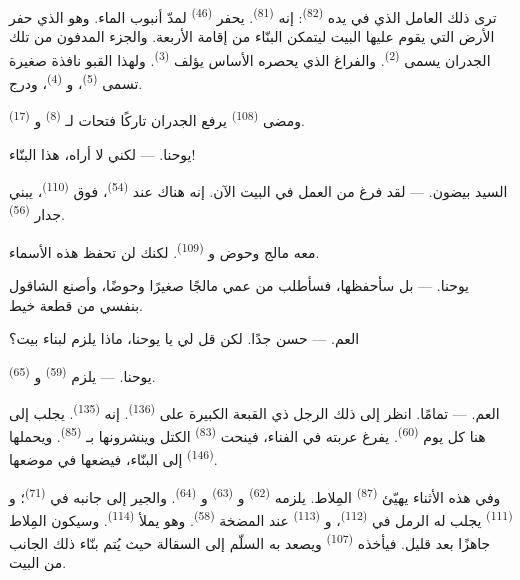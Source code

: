 ترى ذلك العامل الذي في يده  \textsuperscript{(82)}: إنه
 \textsuperscript{(81)}. يحفر  \textsuperscript{(46)}
لمدّ أنبوب الماء. وهو الذي حفر الأرض التي يقوم عليها البيت ليتمكن البنّاء
من إقامة  الأربعة. والجزء المدفون من تلك الجدران يسمى
 \textsuperscript{(2)}. والفراغ الذي يحصره الأساس يؤلف
 \textsuperscript{(3)}. ولهذا القبو نافذة صغيرة تسمى
 \textsuperscript{(5)}، و \textsuperscript{(4)}، ودرج.

ومضى  \textsuperscript{(108)} يرفع الجدران تاركًا فتحات
لـ \textsuperscript{(8)} و \textsuperscript{(17)}.

\textsc{يوحنا}. --- لكني لا أراه، هذا البنّاء!

\textsc{السيد بيضون}. --- لقد فرغ من العمل في البيت الآن. إنه هناك عند
 \textsuperscript{(54)}، فوق  \textsuperscript{(110)}،
يبني جدار  \textsuperscript{(56)}.

معه مالج وحوض و \textsuperscript{(109)}. لكنك لن تحفظ هذه
الأسماء.

\textsc{يوحنا}. --- بل سأحفظها، فسأطلب من عمي مالجًا صغيرًا وحوضًا، وأصنع
الشاقول بنفسي من قطعة خيط.

\VUsaut{3.0mm}
\VUsaut{3.0mm}

\textsc{العم}. --- حسن جدًا. لكن قل لي يا يوحنا، ماذا يلزم لبناء بيت؟

\textsc{يوحنا}. --- يلزم  \textsuperscript{(59)}
و \textsuperscript{(65)}.

\textsc{العم}. --- تمامًا. انظر إلى ذلك الرجل ذي القبعة الكبيرة على
 \textsuperscript{(136)}. إنه  \textsuperscript{(135)}.
يجلب إلى هنا كل يوم  \textsuperscript{(60)}. يفرغ عربته في
الفناء، فينحت  \textsuperscript{(83)} الكتل وينشرونها
بـ \textsuperscript{(85)}. ويحملها 
\textsuperscript{(146)} إلى البنّاء، فيضعها في موضعها.

وفي هذه الأثناء يهيّئ  \textsuperscript{(87)} المِلاط.
يلزمه  \textsuperscript{(62)} و \textsuperscript{(63)}
و \textsuperscript{(64)}. والجير إلى جانبه في 
\textsuperscript{(71)}؛ و \textsuperscript{(111)} يجلب له الرمل
في  \textsuperscript{(112)}، و \textsuperscript{(113)}
عند المضخة \textsuperscript{(58)}. وهو يملأ  \textsuperscript{(114)}.
وسيكون المِلاط جاهزًا بعد قليل. فيأخذه 
\textsuperscript{(107)} ويصعد به السلّم إلى السقالة حيث يُتم بنّاء ذلك الجانب
من البيت.

